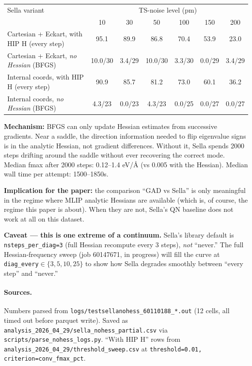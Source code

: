 \documentclass[11pt]{article}
\begin{document}
\begin{center}\small
\begin{tabular}{l|cccccc}
\toprule
Sella variant & \multicolumn{6}{c}{TS-noise level (pm)} \\
              & 10 & 30 & 50 & 100 & 150 & 200 \\
\midrule
Cartesian + Eckart, with HIP H (every step)  & 95.1 & 89.9 & 86.8 & 70.4 & 53.9 & 23.0 \\
Cartesian + Eckart, \emph{no Hessian} (BFGS) & 10.0/30 & 3.4/29 & 10.0/30 & 3.3/30 & 0.0/29 & 3.4/29 \\
Internal coords, with HIP H (every step)     & 90.9 & 85.7 & 81.2 & 73.0 & 60.1 & 36.2 \\
Internal coords, \emph{no Hessian} (BFGS)    & 4.3/23 & 0.0/23 & 4.3/23 & 0.0/25 & 0.0/27 & 0.0/27 \\
\bottomrule
\end{tabular}
\end{center}

\textbf{Mechanism:} BFGS can only update Hessian estimates from successive
gradients. Near a saddle, the direction information needed to flip eigenvalue
signs is in the analytic Hessian, not gradient differences. Without it, Sella
spends 2000 steps drifting around the saddle without ever recovering the
correct mode. Median fmax after 2000 steps: 0.12--1.4 eV/{\AA} (vs 0.005 with
the Hessian). Median wall time per attempt: 1500--1850s.

\textbf{Implication for the paper:} the comparison ``GAD vs Sella'' is only
meaningful in the regime where MLIP analytic Hessians are available (which
is, of course, the regime this paper is about). When they are not, Sella's
QN baseline does not work at all on this dataset.

\textbf{Caveat — this is one extreme of a continuum.} Sella's library
default is \texttt{nsteps\_per\_diag=3} (full Hessian recompute every 3
steps), \emph{not} ``never.'' The full Hessian-frequency sweep (job 60147671,
in progress) will fill the curve at \texttt{diag\_every}$\in\{3,5,10,25\}$
to show how Sella degrades smoothly between ``every step'' and ``never.''

\paragraph{Sources.} Numbers parsed from
\texttt{logs/testsellanohess\_60110188\_*.out} (12 cells, all timed out
before parquet write). Saved as
\texttt{analysis\_2026\_04\_29/sella\_nohess\_partial.csv} via
\texttt{scripts/parse\_nohess\_logs.py}. ``With HIP H'' rows from
\texttt{analysis\_2026\_04\_29/threshold\_sweep.csv} at
\texttt{threshold=0.01, criterion=conv\_fmax\_pct}.
\end{document}
